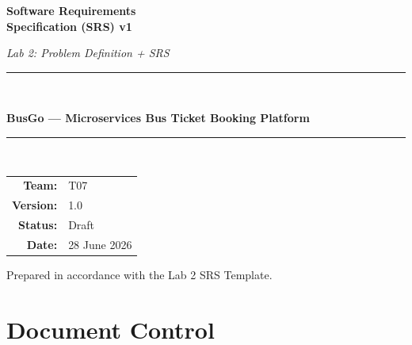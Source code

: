 \documentclass[11pt,a4paper]{article}
\begin{document}
\begin{titlepage}
\centering
\vspace*{1.5cm}
{\color{busgoblue}\Huge\bfseries Software Requirements\\[0.3cm] Specification (SRS) v1\par}
\vspace{0.8cm}
{\Large\itshape Lab 2: Problem Definition + SRS\par}
\vspace{1.2cm}
\rule{\textwidth}{1.2pt}\\[0.4cm]
{\LARGE\bfseries BusGo — Microservices Bus Ticket Booking Platform\par}
\rule{\textwidth}{1.2pt}\\[1.2cm]


\vspace{1.5cm}
{\large
\begin{tabular}{rl}
\textbf{Team:} & T07 \\
\textbf{Version:} & 1.0 \\
\textbf{Status:} & Draft \\
\textbf{Date:} & 28 June 2026 \\
\end{tabular}}

\vfill
{\small Prepared in accordance with the Lab 2 SRS Template.\par}
\end{titlepage}

\tableofcontents
\newpage

\section{Document Control}
\end{document}
